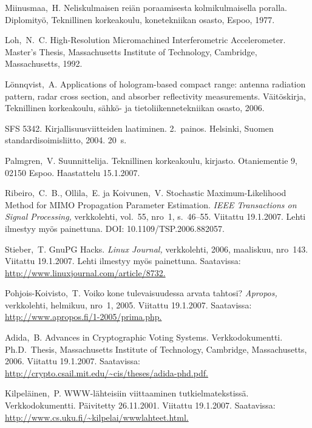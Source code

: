 \documentclass[finnish, 12pt, a4paper, sci, utf8, pdfa]{aaltothesis}
\begin{document}
\begin{thebibliography}{99}
 Miinusmaa,\ H. Neliskulmaisen reiän poraamisesta
  kolmikulmaisella poralla. Diplomityö, Teknillinen korkeakoulu,
  konetekniikan osasto, Espoo, 1977.

 Loh,\ N.\ C. High-Resolution Micromachined
  Interferometric Accelerometer. Master's Thesis, Massachusetts
  Institute of Technology, Cambridge,
  \foreignlanguage{english}{Massachusetts,} 1992.

 Lönnqvist,\ A.
  \foreignlanguage{english}{Applications of hologram-based compact
    range: antenna radiation pattern, radar cross section, and
    absorber reflectivity measurements.}
  Väitöskirja, Teknillinen korkeakoulu, sähkö- ja tietoliikennetekniikan
  osasto, 2006.

 SFS 5342. Kirjallisuusviitteiden laatiminen. 2.\ painos.
  Helsinki, Suomen standardisoimisliitto, 2004. 20~s.

 Palmgren,\ V. Suunnittelija. Teknillinen
  korkeakoulu, kirjasto. Otaniementie 9, 02150 Espoo. Haastattelu
  15.1.2007.

 Ribeiro,\ C.\ B., Ollila,\ E. ja Koivunen,\ V.
  \foreignlanguage{english}{Stochastic Maximum-Likelihood Method for
    MIMO Propagation Parameter Estimation.}
 \textit{IEEE Transactions
    on Signal Processing,} verkkolehti, vol.\ 55, nro~1, s.\ 46--55.
  Viitattu 19.1.2007. Lehti ilmestyy myös painettuna. DOI:
  10.1109/TSP.2006.882057.

 Stieber,\ T. GnuPG Hacks. \textit{Linux Journal,}
  verkkolehti, 2006, maaliskuu, nro~143. Viitattu 19.1.2007. Lehti
  ilmestyy myös painettuna. Saatavissa:
  \url{http://www.linuxjournal.com/article/8732.}

 Pohjois-Koivisto,\ T. Voiko kone tulevaisuudessa arvata
  tahtosi?  \textit{Apropos,} verkkolehti, helmikuu, nro~1, 2005.
  Viitattu 19.1.2007.  Saatavissa:
  \url{http://www.apropos.fi/1-2005/prima.php.}

 Adida,\ B.  Advances in Cryptographic Voting Systems.
  Verkkodokumentti. Ph.D.\ Thesis, Massachusetts Institute of
  Technology, Cambridge, 
  \foreignlanguage{english}{Massachusetts,}
  2006. Viitattu 19.1.2007.  Saatavissa:
  \url{http://crypto.csail.mit.edu/~cis/theses/adida-phd.pdf.}

 Kilpeläinen,\ P. WWW-lähteisiin viittaaminen
  tutkielmatekstissä. Verkkodokumentti. Päivitetty 26.11.2001.
  Viitattu 19.1.2007. Saatavissa:
  \url{http://www.cs.uku.fi/~kilpelai/wwwlahteet.html.}

\end{thebibliography}
\end{document}
